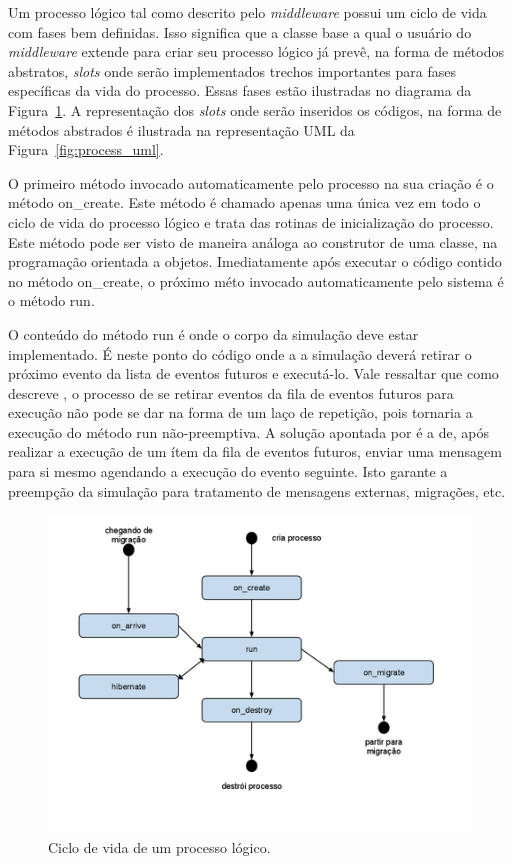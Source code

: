 Um processo lógico tal como descrito pelo \textit{middleware} possui um ciclo de vida com fases bem definidas. Isso significa que a classe base a qual o usuário do \textit{middleware} extende para criar seu processo lógico já prevê, na forma de métodos abstratos, \textit{slots} onde serão implementados trechos importantes para fases específicas da vida do processo. Essas fases estão ilustradas no diagrama da Figura~\ref{fig:estados_processos}. A representação dos \textit{slots} onde serão inseridos os códigos, na forma de métodos abstrados é ilustrada na representação UML da Figura~\ref{fig:process_uml}.

O primeiro método invocado automaticamente pelo processo na sua criação é o método on\_create. Este método é chamado apenas uma única vez em todo o ciclo de vida do processo lógico e trata das rotinas de inicialização do processo. Este método pode ser visto de maneira análoga ao construtor de uma classe, na programação orientada a objetos. Imediatamente após executar o código contido no método on\_create, o próximo méto invocado automaticamente pelo sistema é o método run.

O conteúdo do método run é onde o corpo da simulação deve estar implementado. É neste ponto do código onde a a simulação deverá retirar o próximo evento da lista de eventos futuros e executá-lo. Vale ressaltar que como descreve \cite{RIBEIROALVES}, o processo de se retirar eventos da fila de eventos futuros para execução não pode se dar na forma de um laço de repetição, pois tornaria a execução do método run não-preemptiva. A solução apontada por \cite{RIBEIROALVES} é a de, após realizar a execução de um ítem da fila de eventos futuros, enviar uma mensagem para si mesmo agendando a execução do evento seguinte. Isto garante a preempção da simulação para tratamento de mensagens externas, migrações, etc.

\begin{figure}
  \centerline{\includegraphics{estados_processos.png}}
  \caption{Ciclo de vida de um processo lógico.}
\label{fig:estados_processos}
\end{figure}

